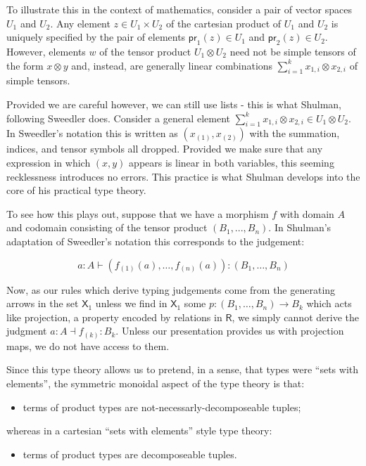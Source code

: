 \documentclass[pra,floatfix,
amsmath,superscriptaddress, 12pt]{article}
\theoremstyle{definition}
\newcommand{\msf}[1]{\mathsf{#1}}
\begin{document}
To illustrate this in the context of mathematics, consider a pair of vector spaces $U_1$ and $U_2$. Any element $z\in U_1 \times U_2$ of the cartesian product of $U_1$ and $U_2$ is uniquely specified by the pair of elements $\msf{pr}_{1}(z) \in U_1$ and $\msf{pr}_{2}(z)\in U_2$. However, elements $w$ of the tensor product $U_1 \otimes U_2$ need not be simple tensors of the form $x \otimes y$ and, instead, are generally linear combinations $\sum_{i=1}^{k}x_{1,i} \otimes x_{2,i}$ of simple tensors.

Provided we are careful however, we can still use lists - this is what Shulman, following Sweedler does. Consider a general element $\sum_{i=1}^{k}x_{1,i}\otimes x_{2,i} \in U_1 \otimes U_2$. In Sweedler's notation this is written as $(x_{(1)}, x_{(2)})$ with the summation, indices, and tensor symbols all dropped. Provided we make sure that any expression in which $(x,y)$ appears is linear in both variables, this seeming recklessness introduces no errors. This practice is what Shulman develops into the core of his practical type theory.

To see how this plays out, suppose that we have a morphism $f$ with domain $A$ and codomain consisting of the tensor product $(B_1,...,B_n)$. In Shulman's adaptation of Sweedler's notation this corresponds to the judgement:

\[
a:A\vdash\left(f_{\left(1\right)}\left(a\right),\dots,f_{\left(n\right)}\left(a\right)\right):\left(B_{1},\dots,B_{n}\right)
\]

Now, as our rules which derive typing judgements come from the generating arrows in the set $\msf{X}_1$ unless we find in $\msf{X}_1$ some $p:(B_1,\dots,B_n) \rightarrow B_k$ which acts like projection, a property encoded by relations in $\msf{R}$, we simply cannot derive the judgment $a:A \dashv f_{(k)}:B_k$. Unless our presentation provides us with projection maps, we do not have access to them.

Since this type theory allows us to pretend, in a sense, that types were ``sets with elements'', the symmetric monoidal aspect of the type theory is that:
\begin{itemize}
    \item terms of product types are not-necessarly-decomposeable tuples;
\end{itemize}
whereas in a cartesian ``sets with elements'' style type theory:
\begin{itemize}
    \item terms of product types are decomposeable tuples.
\end{itemize}
\end{document}
